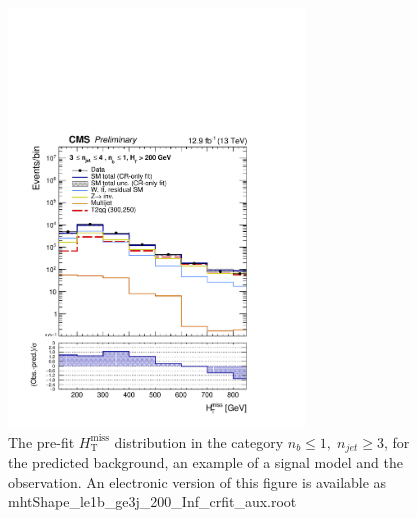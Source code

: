 \clearpage
\begin{figure}[tbhp]
    \caption{ 
    The pre-fit $H_{\mathrm{T}}^{\mathrm{miss}}$ distribution in the category $n_{b}\leq 1, \; n_{jet} \geq 3$, 
    for the predicted background, an example of a signal model and the observation.
    An electronic version of this figure is available as mhtShape\_le1b\_ge3j\_200\_Inf\_crfit\_aux.root
    \label{fig:mhtShape_le1b_ge3j_crfit} }
  \begin{center}
  \includegraphics[width=0.7\textwidth]{mhtShape_le1b_ge3j_200_Inf_crfit_aux}
  \end{center}
\end{figure}


